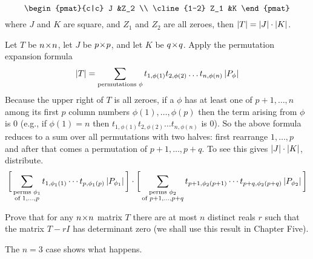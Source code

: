 \begin{exercises}
\begin{equation*}
\begin{pmat}{c|c}
          J   &Z_2  \\  \cline{1-2}
          Z_1 &K
       \end{pmat}
    \end{equation*}
    where $J$ and $K$ are square, and $Z_1$ and $Z_2$ are all zeroes,
    then \( \deter{T}=\deter{J}\cdot\deter{K} \).
    \begin{answer}
      Let \( T \) be \( n \! \times \! n \),
      let \( J \) be \( p \! \times \! p \),
      and let \( K \) be \( q \! \times \! q \).
      Apply the permutation expansion formula
      \begin{equation*}
        \deter{T}=
        \sum_{\text{\scriptsize permutations }\phi}
                t_{1,\phi(1)}t_{2,\phi(2)}\dots t_{n,\phi(n)}
                \deter{P_{\phi}}
      \end{equation*}
      Because the upper right of \( T \) is all zeroes, if a
      \( \phi \) has at least one of \( p+1,\dots,n \) among its first
      \( p \) column numbers \( \phi(1),\dots,\phi(p) \) then the term arising
      from \( \phi \) is \( 0 \)
      (e.g., if \( \phi(1)=n \) then
      \( t_{1,\phi(1)}t_{2,\phi(2)}\dots t_{n,\phi(n)} \)
      is \( 0 \)).
      So the above formula reduces to a sum over all permutations
      with two halves:
      first rearrange \( 1,\dots,p \) and after that comes
      a permutation of
      \( p+1,\dots,p+q \).
      To see this gives \( \deter{J}\cdot\deter{K}  \), distribute.
      \begin{equation*}
         \bigg[\sum_{\substack{\text{\scriptsize perms }\phi_1 \\
                              \text{\scriptsize of } 1,\dots,p}}
               t_{1,\phi_1(1)}\cdots t_{p,\phi_1(p)} 
               \deter{P_{\phi_1}}                            \bigg]\cdot
         \bigg[\sum_{\substack{\text{\scriptsize perms }\phi_2 \\
                              \text{\scriptsize of } p+1,\dots,p+q}}
               t_{p+1,\phi_2(p+1)}\cdots t_{p+q,\phi_2(p+q)} 
               \deter{P_{\phi_2}}                          \bigg]
      \end{equation*}  
    \end{answer}
  \recommended \item
    Prove that for any \( n \! \times \! n \) matrix \( T \) there are at most
    \( n \) distinct reals \( r \) such that the matrix \( T-rI \) has
    determinant zero
    (we shall use this result in Chapter Five).
    \begin{answer}
      The $n=3$ case shows what happens.

\end{answer}
\end{exercises}
